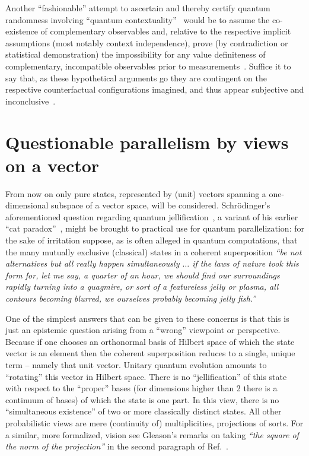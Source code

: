 \documentclass{ws-procs9x6}
\begin{document}
Another ``fashionable'' attempt to ascertain and thereby certify quantum randomness involving ``quantum contextuality''~\cite{svozil-2009-howto,svozil-2017-b}
would be to assume the co-existence of complementary observables
and, relative to the respective implicit assumptions (most notably context independence), prove (by contradiction or statistical demonstration) the impossibility
for any value definiteness of complementary, incompatible observables prior to measurements~\cite{kochen1,froissart-81,pitowsky:218,2015-AnalyticKS,svozil-2017-b}.
Suffice it to say that, as these hypothetical arguments go they are contingent on the respective
counterfactual configurations imagined, and thus appear subjective and inconclusive~\cite{svozil-2020-c}.


\section{Questionable parallelism by views on a vector}

From now on only pure states, represented by (unit) vectors spanning a one-dimensional subspace of a vector space, will be considered.
Schr\"odinger's aforementioned question regarding quantum jellification~\cite{schroedinger-interpretation},
a variant of his earlier ``cat paradox''~\cite{schrodinger}, might be brought to  practical use for quantum parallelization:
for the sake of irritation suppose, as is often alleged in quantum computations, that the many mutually exclusive (classical) states in a coherent superposition
\emph{``be not alternatives but all really happen simultaneously $\ldots$
if the laws of nature took this form for, let
me say, a quarter of an hour, we should find our surroundings rapidly
turning into a quagmire, or sort of a featureless jelly or plasma, all contours
becoming blurred, we ourselves probably becoming jelly fish.''}

One of the simplest answers that can be given to these concerns is that this is just an epistemic question arising from a ``wrong'' viewpoint or perspective.
Because if one chooses an orthonormal basis of Hilbert space of which the state vector is an element then
the coherent superposition reduces to a single, unique term -- namely that unit vector.
Unitary quantum evolution amounts to ``rotating'' this vector in Hilbert space.
There is no ``jellification'' of this state with respect to the ``proper'' bases (for dimensions higher than 2 there is a continuum of bases)
of which the state is one part.
In this view, there is no ``simultaneous existence'' of two or more classically distinct states.
All other probabilistic views are mere (continuity of) multiplicities, projections of sorts.
For a similar, more formalized, vision see Gleason's remarks on taking
\emph{``the square of the norm of the projection''} in the second paragraph of Ref.~\cite{Gleason}.
\end{document}
